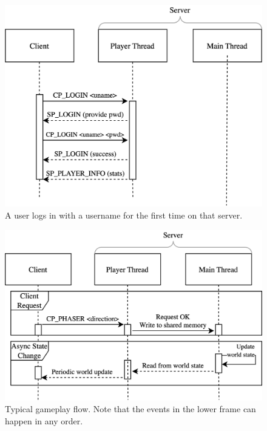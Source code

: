 \begin{figure}[h]
  \includegraphics[width=\columnwidth]{figures/nt-login}
  \caption{A user logs in with a username for the first time on that server.}
  \Description[]{}
\end{figure}
\begin{figure}[h]
  \includegraphics[width=\columnwidth]{figures/nt-typical}
  \caption{Typical gameplay flow. Note that the events in the lower frame can happen in any order.}
  \Description[]{}
\end{figure}
